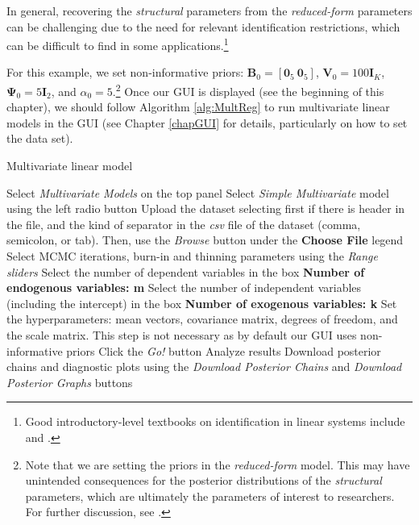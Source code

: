 In general, recovering the \textit{structural} parameters from the \textit{reduced-form} parameters can be challenging due to the need for relevant identification restrictions, which can be difficult to find in some applications.\footnote{Good introductory-level textbooks on identification in linear systems include \cite[Chap. ~19]{gujarati2009basic} and \cite[Chap. ~16]{wooldridge2016introductory}.}

For this example, we set non-informative priors: $\bm{B}_0 = \left[\bm{0}_5 \ \bm{0}_5\right]$, $\bm{V}_0 = 100 \bm{I}_K$, $\bm{\Psi}_0 = 5 \bm{I}_2$, and $\alpha_0 = 5$.\footnote{Note that we are setting the priors in the \textit{reduced-form} model. This may have unintended consequences for the posterior distributions of the \textit{structural} parameters, which are ultimately the parameters of interest to researchers. For further discussion, see \cite[p.~302]{koop2003bayesian}.} Once our GUI is displayed (see the beginning of this chapter), we should follow Algorithm \ref{alg:MultReg} to run multivariate linear models in the GUI (see Chapter \ref{chapGUI} for details, particularly on how to set the data set).
\begin{algorithm}[h!]
	\caption{Multivariate linear model}\label{alg:MultReg}
	\begin{algorithmic}[1]  		 			
		\State Select \textit{Multivariate Models} on the top panel
		\State Select \textit{Simple Multivariate} model using the left radio button
		\State Upload the dataset selecting first if there is header in the file, and the kind of separator in the \textit{csv} file of the dataset (comma, semicolon, or tab). Then, use the \textit{Browse} button under the \textbf{Choose File} legend
		\State Select MCMC iterations, burn-in and thinning parameters using the \textit{Range sliders}
		\State Select the number of dependent variables in the box \textbf{Number of endogenous variables: m}
		\State Select the number of independent variables (including the intercept) in the box \textbf{Number of exogenous variables: k}
		\State Set the hyperparameters: mean vectors, covariance matrix, degrees of freedom, and the scale matrix. This step is not necessary as by default our GUI uses non-informative priors
		\State Click the \textit{Go!} button
		\State Analyze results
		\State Download posterior chains and diagnostic plots using the \textit{Download Posterior Chains} and \textit{Download Posterior Graphs} buttons
	\end{algorithmic} 
\end{algorithm}

